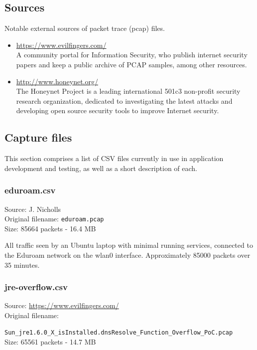 \documentclass[12pt,a4paper]{article}
\begin{document}
	\subsection*{Sources}
	
	Notable external sources of packet trace (pcap) files.
	
	\begin{itemize}
		\item \url{https://www.evilfingers.com/} \\
		A community portal for Information Security, who publish
		internet security papers and keep a public archive of
		PCAP samples, among other resources.
		
		\item \url{http://www.honeynet.org/} \\
		The Honeynet Project is a leading international 501c3
		non-profit security research organization, dedicated to
		investigating the latest attacks and developing open source
		security tools to improve Internet security.
	\end{itemize}
	
	\pagebreak
	
	\subsection*{Capture files}
	This section comprises a list of CSV files currently in use in
	application development and testing, as well as a short
	description of each.
	
	\subsubsection*{eduroam.csv}
	Source: J. Nicholls\\
	Original filename: \verb!eduroam.pcap!\\
	Size: 85664 packets - 16.4 MB

    All traffic seen by an Ubuntu laptop with minimal running
	services, connected to the Eduroam network on the wlan0
	interface. Approximately 85000 packets over 35 minutes.
	
	\subsubsection*{jre-overflow.csv}
	Source: \url{https://www.evilfingers.com/}\\
	Original filename:\\
	\verb!        Sun_jre1.6.0_X_isInstalled.dnsResolve_Function_Overflow_PoC.pcap!\\
	Size: 65561 packets - 14.7 MB
\end{document}
